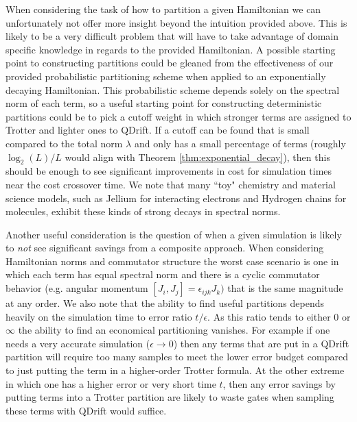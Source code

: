 When considering the task of how to partition a given Hamiltonian we can unfortunately not offer more insight beyond the intuition provided above. This is likely to be a very difficult problem that will have to take advantage of domain specific knowledge in regards to the provided Hamiltonian. A possible starting point to constructing partitions could be gleaned from the effectiveness of our provided probabilistic partitioning scheme when applied to an exponentially decaying Hamiltonian. This probabilistic scheme depends solely on the spectral norm of each term, so a useful starting point for constructing deterministic partitions could be to pick a cutoff weight in which stronger terms are assigned to Trotter and lighter ones to QDrift. If a cutoff can be found that is small compared to the total norm $\lambda$ and only has a small percentage of terms (roughly $\log_2 (L) / L$ would align with Theorem \ref{thm:exponential_decay}), then this should be enough to see significant improvements in cost for simulation times near the cost crossover time. We note that many ``toy" chemistry and material science models, such as Jellium \cite{babbush2018low} for interacting electrons and Hydrogen chains \cite{whitfield2011simulation} for molecules, exhibit these kinds of strong decays in spectral norms.

Another useful consideration is the question of when a given simulation is likely to \emph{not} see significant savings from a composite approach. When considering Hamiltonian norms and commutator structure the worst case scenario is one in which each term has equal spectral norm and there is a cyclic commutator behavior (e.g. angular momentum $[J_i, J_j] = \epsilon_{ijk} J_k)$ that is the same magnitude at any order. We also note that the ability to find useful partitions depends heavily on the simulation time to error ratio $t / \epsilon$. As this ratio tends to either 0 or $\infty$ the ability to find an economical partitioning vanishes. For example if one needs a very accurate simulation ($\epsilon \to 0$) then any terms that are put in a QDrift partition will require too many samples to meet the lower error budget compared to just putting the term in a higher-order Trotter formula. At the other extreme in which one has a higher error or very short time $t$, then any error savings by putting terms into a Trotter partition are likely to waste gates when sampling these terms with QDrift would suffice.


